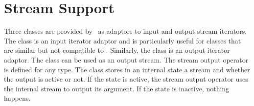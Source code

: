 \section{Stream Support} 

Three classes are provided by \cgal\ as adaptors to input and output stream
iterators.  The class  is an input iterator adaptor and 
is particularly useful for classes that are similar but not compatible to 
.  Similarly, the class  is an output 
iterator adaptor.  The class  can be used as an output 
stream. The stream
output operator \ccc{<<} is defined for any type. The class
stores in an internal state a stream and whether the
output is active or not. If the state is active, the stream output
operator \ccc{<<} uses the internal stream to output its argument. If
the state is inactive, nothing happens.

